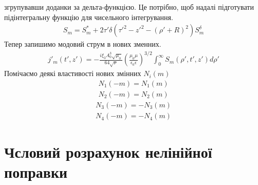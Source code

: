 згрупувавши доданки за дельта-функцією. Це потрібно, щоб надалі 
підготувати підінтегральну функцію для чисельного інтегрування.
%
\begin{equation*} \begin{aligned}
S_m = S_m^* + 2 \tau' \delta 
\left( {\tau'}^2 - {z'}^2 - (\rho' + R)^2 \right) S_m^\delta
\end{aligned} \end{equation*}
%
Тепер запишимо модовий струм в нових зменних.
%
\begin{equation*} \begin{aligned}
j'_m (t',z') = - \frac{i \xi_3 A_0^3 \sqrt{\mu_0}}{64 \sqrt{\nu}}
\left( \frac{\mu_0 \mu} {\epsilon_0 \epsilon} \right)^{3/2}
\int_{0}^{\infty} S_{m} (\rho',t',z') d \rho'
\end{aligned} \end{equation*}
%
Помічаємо деякі властивості нових змінних $ N_i(m) $
%
\begin{equation*} \begin{aligned}
N_{1} (-m) = N_{1} (m)
\end{aligned} \end{equation*}
%
\begin{equation*} \begin{aligned}
N_{2} (-m) = N_{2} (m)
\end{aligned} \end{equation*}
%
\begin{equation*} \begin{aligned}
N_{3} (-m) = - N_{3} (m)
\end{aligned} \end{equation*}
%
\begin{equation*} \begin{aligned}
N_{4} (-m) = - N_{4} (m)
\end{aligned} \end{equation*}

\section{Чсловий розрахунок нелінійної поправки}

